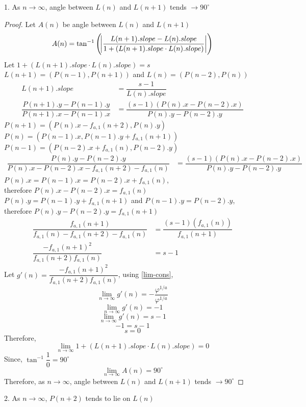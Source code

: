 \documentclass[preprint,12pt]{elsarticle}
\begin{document}
	1. As $n \to \infty$, angle between $L(n)$ and $L(n+1)$ tends $\to 90^\circ$

\begin{proof}
	Let $A(n)$ be angle between $L(n)$ and $L(n+1)$
	$$A(n) = \tan^{-1}\left({\abs{\dfrac{L(n+1).slope-L(n).slope}{1+(L(n+1).slope \cdot L(n).slope)}}}\right)$$
	Let $1 + (L(n+1).slope \cdot L(n).slope) = s$\\
	$L(n+1) = (P(n-1), P(n+1))$ and $L(n) = (P(n-2), P(n))$
	\begin{align*}
	L(n+1).slope &= \dfrac{s - 1}{L(n).slope}\\
	\dfrac{P(n+1).y - P(n-1).y}{P(n+1).x - P(n-1).x} &= \dfrac{(s-1)(P(n).x-P(n-2).x)}{P(n).y-P(n-2).y}
	\end{align*}
	$P(n+1) = (P(n).x - f_{a,1}(n+2), P(n).y)$\\
	$P(n) = (P(n-1).x, P(n-1).y+f_{a,1}(n+1))$\\
	$P(n-1) = (P(n-2).x+f_{a,1}(n), P(n-2).y)$
	\begin{align*}
	\dfrac{P(n).y-P(n-2).y}{P(n).x-P(n-2).x-f_{a,1}(n+2)-f_{a,1}(n)} &= \dfrac{(s-1)(P(n).x-P(n-2).x)}{P(n).y-P(n-2).y}
	\end{align*}
	$P(n).x = P(n-1).x = P(n-2).x+f_{a,1}(n)$,\\ therefore $P(n).x-P(n-2).x=f_{a,1}(n)$\\
	$P(n).y = P(n-1).y+f_{a,1}(n+1)$ and $P(n-1).y = P(n-2).y$,\\ therefore $P(n).y-P(n-2).y=f_{a,1}(n+1)$
	\begin{align*}
	\dfrac{f_{a,1}(n+1)}{f_{a,1}(n)-f_{a,1}(n+2)-f_{a,1}(n)} &= \dfrac{(s-1)(f_{a,1}(n))}{f_{a,1}(n+1)}\\
	\dfrac{-f_{a,1}(n+1)^2}{f_{a,1}(n+2)f_{a,1}(n)} &= s - 1
	\end{align*}
	Let $g'(n) = \dfrac{-f_{a,1}(n+1)^2}{f_{a,1}(n+2)f_{a,1}(n)}$, using \ref{lim-cons},
	$$\lim_{n \to \infty}g'(n) = -\dfrac{\varphi^{1/a}}{\varphi^{1/a}}$$
	$$\lim_{n \to \infty}g'(n) = -1$$
	$$\lim_{n \to \infty}g'(n) = s - 1$$
	$$-1 = s - 1$$
	$$s = 0$$
	Therefore, $$\lim_{n \to \infty}1 + (L(n+1).slope \cdot L(n).slope) = 0$$
	Since, $\tan^{-1}{\dfrac{1}{0}} = 90^\circ$
	$$\lim_{n \to \infty} A(n) = 90^\circ$$
	Therefore, as $n \to \infty$, angle between $L(n)$ and $L(n+1)$ tends $\to 90^\circ$
\end{proof}

	2. As $n \to \infty$, $P(n+2)$ tends to lie on $L(n)$
\end{document}
